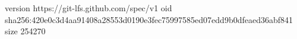 version https://git-lfs.github.com/spec/v1
oid sha256:420e0c3d4aa91408a28553d0190e3fec75997585ed07edd9b0dfeaed36abf841
size 254270
